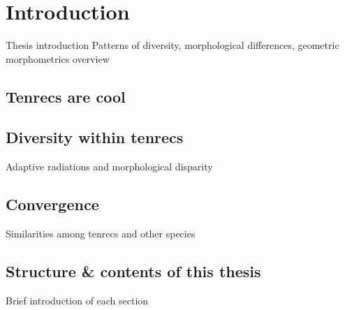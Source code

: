 \chapter{Introduction}
\label{chap:introduction}



\noindent
Thesis introduction
Patterns of diversity, morphological differences, geometric morphometrics overview

\section{Tenrecs are cool}




\section{Diversity within tenrecs}

Adaptive radiations and morphological disparity

\section{Convergence}
Similarities among tenrecs and other species



\section{Structure \& contents of this thesis}
Brief introduction of each section
%
%
%

